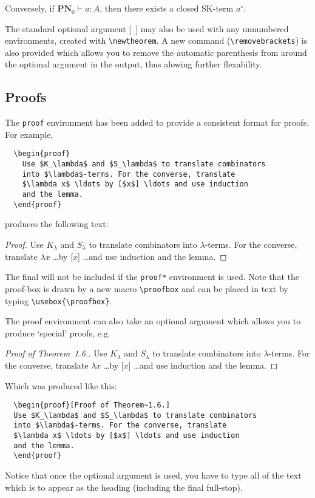 \documentclass{mscs}
\begin{document}
  \begin{lemma*}
    Conversely, if $\mathbf{PN}_0 \vdash a\colon A$, then
    there exists a closed SK-term $a^\circ$.
  \end{lemma*}
The standard optional argument [\ ] may also be used with any
unnumbered environments, created with \verb"\newtheorem". A new
command (\verb"\removebrackets") is also provided which allows you
to remove the automatic parenthesis from around the optional
argument in the output, thus alowing further flexability.

\subsection{Proofs}

The \verb"proof" environment has been added to provide a consistent
format for proofs. For example,
\begin{verbatim}
  \begin{proof}
    Use $K_\lambda$ and $S_\lambda$ to translate combinators
    into $\lambda$-terms. For the converse, translate
    $\lambda x$ \ldots by [$x$] \ldots and use induction
    and the lemma.
  \end{proof}
\end{verbatim}
produces the following text:
\begin{proof}
  Use $K_\lambda$ and $S_\lambda$ to translate combinators
  into $\lambda$-terms. For the converse, translate
  $\lambda x$ \ldots by [$x$] \ldots and use induction
  and the lemma.
\end{proof}

The final \usebox{\proofbox} will not be included if the \verb"proof*"
environment is used. Note that the proof-box is drawn by a new macro
\verb"\proofbox" and can be placed in text by typing \linebreak
\verb"\usebox{\proofbox}".

The proof environment can also take an optional argument which allows you
to produce `special' proofs, e.g.
%
  \begin{proof}[Proof of Theorem~1.6.]
  Use $K_\lambda$ and $S_\lambda$ to translate combinators
  into $\lambda$-terms. For the converse, translate
  $\lambda x$ \ldots by [$x$] \ldots and use induction
  and the lemma.
  \end{proof}
%
Which was produced like this:
%
\begin{verbatim}
  \begin{proof}[Proof of Theorem~1.6.]
  Use $K_\lambda$ and $S_\lambda$ to translate combinators
  into $\lambda$-terms. For the converse, translate
  $\lambda x$ \ldots by [$x$] \ldots and use induction
  and the lemma.
  \end{proof}
\end{verbatim}
%
Notice that once the optional argument is used, you have to type all of
the text which is to appear as the heading (including the final full-stop).
\end{document}
